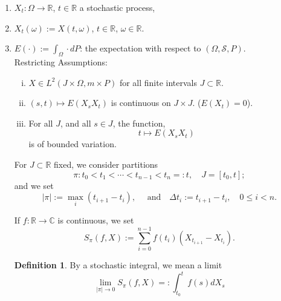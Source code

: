 \documentclass{amsart}
\theoremstyle{definition}
\newtheorem{definition}[theorem]{Definition}
\theoremstyle{remark}
\numberwithin{equation}{section}
\begin{document}
\begin{enumerate}[(1) ]
\item $X_{t}: \Omega \to \mathbb{R}$, $t \in \mathbb{R}$ a stochastic 
      process, 
\item $X_{t}(\omega):=X(t,\omega)$, $t \in \mathbb{R}$, 
      $\omega \in \mathbb{R}$. 
\item $E(\cdot):=\int_{\Omega} \cdot dP$: the expectation with respect to 
      $(\Omega, \mathcal{S}, P)$. \\
      Restricting Assumptions:
      \begin{enumerate}[(i) ]
      \item $X \in L^{2}(J \times \Omega, m \times P)$ for all finite 
            intervals $J \subset \mathbb{R}$. 
      \item $(s, t) \longmapsto E(X_{s} X_{t})$ is continuous on 
            $J \times J$. ($E(X_{t})=0$). 
      \item For all $J$, and all $s \in J$, the function, 
        \begin{equation}
        
        \label{eq2.1}
          t \longmapsto E(X_{s} X_{t}) 
        \end{equation} 
            is of bounded variation.
      \end{enumerate}
      For $J \subset \mathbb{R}$ fixed, we consider partitions 
      \begin{equation}
      
      \label{eq2.2}
        \pi: t_{0} < t_{1} < \cdots < t_{n-1} < t_{n} =: t, \quad 
        J=[t_{0}, t];
      \end{equation}
      and we set 
      \begin{equation}
      
      \label{eq2.3}
        |\pi|:= \max_{i}(t_{i+1}-t_{i}), \quad \mbox{ and} \quad 
        \Delta t_{i}:=t_{i+1}-t_{i},  \quad 0 \leq i < n.
      \end{equation}

      If $f:\mathbb{R} \to \mathbb{C}$ is continuous, we set
      \begin{equation}
      
      \label{eq2.4}
        S_{\pi}(f, X):= \sum_{i=0}^{n-1}f(t_{i})
        (X_{t_{i+1}}-X_{t_{i}}).
      \end{equation}
      \begin{definition}
      \label{D:2.1}
        By a stochastic integral, we mean a limit
        \begin{equation}
        
        \label{eq2.5}
          \lim_{|\pi| \to 0} S_{\pi}(f, X)=: \int_{t_{0}}^{t}f(s)dX_{s}
        \end{equation}
      \end{definition}
\end{enumerate}
\end{document}
